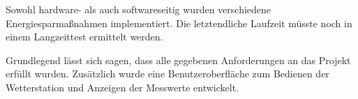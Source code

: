 Sowohl hardware- als auch softwareseitig wurden verschiedene Energiesparmaßnahmen implementiert. Die letztendliche Laufzeit müsste noch in einem Langzeittest ermittelt werden.

Grundlegend lässt sich sagen, dass alle gegebenen Anforderungen an das Projekt erfüllt wurden. Zusätzlich wurde eine Benutzeroberfläche zum Bedienen der Wetterstation und Anzeigen der Messwerte entwickelt.



